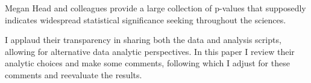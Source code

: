 Megan Head and colleagues provide a large collection of p-values that supposedly indicates widespread statistical significance seeking throughout the sciences.

I applaud their transparency in sharing both the data and analysis scripts, allowing for alternative data analytic perspectives. In this paper I review their analytic choices and make some comments, following which I adjust for these comments and reevaluate the results.